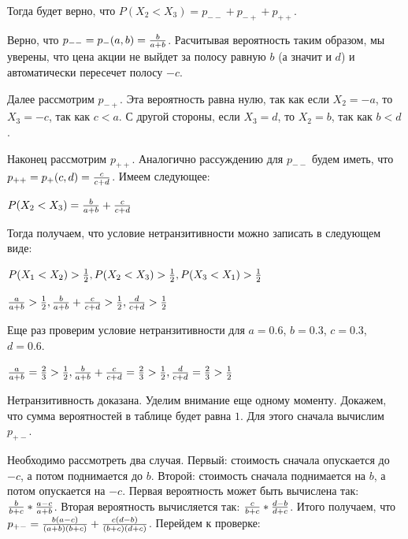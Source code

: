 Тогда будет верно, что $P(X_2 < X_3) = p_{--} + p_{-+} + p_{++}$. 
\smallskip
\smallskip

Верно, что $p_{--} = p_{-}(a, b) = {b\over{a + b}}$. Расчитывая вероятность таким образом, мы уверены, что цена акции не выйдет за полосу равную $b$ (а значит и $d$) и автоматически пересечет полосу $-c$.
\smallskip
\smallskip

Далее рассмотрим $p_{-+}$. Эта вероятность равна нулю, так как если $X_2 = -a$, то $X_3 = -c$, так как $c < a$. С другой стороны, если $X_3 = d$, то $X_2 = b$, так как $b < d$.
\smallskip
\smallskip

Наконец рассмотрим $p_{++}$. Аналогично рассуждению для $p_{--}$ будем иметь, что $p_{++} = p_{+}(c, d) = {c\over{c + d}}$. Имеем следующее: 


\begin{center}
    $P(X_2 < X_3) =  {b\over{a + b}} + {c\over{c + d}}$
\end{center}

Тогда получаем, что условие нетранзитивности можно записать в следующем виде:


\begin{center}
    $P(X_1 < X_2) > {1\over 2}, P(X_2 < X_3) > {1\over 2}, P(X_3 < X_1) > {1\over 2}$
    
    ${a\over{a + b}} > {1\over 2}, {b\over{a + b}} + {c\over{c + d}} > {1\over 2}, {d\over{c + d}} > {1\over 2}$
\end{center}

Еще раз проверим условие нетранзитивности для $a = 0.6$, $b = 0.3$, $c = 0.3$, $d = 0.6$.

\begin{center}
    ${a\over{a + b}} = {2\over 3} > {1\over 2}, {b\over{a + b}} + {c\over{c + d}} = {2\over{3}} > {1\over{2}}, {d\over{c + d}} = {2\over 3} > {1\over 2}$
\end{center}

Нетранзитивность доказана. Уделим внимание еще одному моменту. Докажем, что сумма вероятностей в таблице будет равна $1$. Для этого сначала вычислим  $p_{+-}$.
\smallskip
\smallskip

Необходимо рассмотреть два случая. Первый: стоимость сначала опускается до $-c$, а потом поднимается до $b$. Второй: стоимость сначала поднимается на $b$, а потом опускается на $-c$. Первая вероятность может быть вычислена так:  ${b\over{b + c}} * {a-c\over{a + b}}$. Вторая вероятность вычисляется так: ${c\over{b + c}} * {d-b\over{d + c}}$. Итого получаем, что $p_{+-} = {b(a-c)\over{(a + b)(b + c)}} + {c(d-b)\over{(b + c)(d + c)}}$. Перейдем к проверке:

